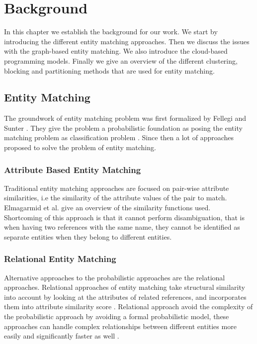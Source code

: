\chapter{Background}
In this chapter we establish the background for our work. We start by introducing the different entity matching approaches. Then we discuss the issues with the graph-based entity matching. We also introduce the cloud-based programming models. Finally we give an overview of the different clustering, blocking and partitioning methods that are used for entity matching.

\section{Entity Matching}
The groundwork of entity matching problem was first formalized by Fellegi and Sunter \cite{FESU69}. They give the problem a probabilistic foundation as posing the entity matching problem as classification problem \cite{RDGa11}. Since then a lot of approaches proposed to solve the problem of entity matching. 

\subsection{Attribute Based Entity Matching}
Traditional entity matching approaches are focused on pair-wise attribute similarities\cite{RDGa11}, i.e the similarity of the attribute values of the pair to match. Elmagarmid et al. \cite{EIVe07} give an overview of the similarity functions used.\\     
Shortcoming of this approach is that it cannot perform disambiguation, that is when having two references with the same name, they cannot be identified as separate entities when they belong to different entities\cite{RDGa11}.

\subsection{Relational Entity Matching}
Alternative approaches to the probabilistic approaches are the relational approaches. Relational approaches of entity matching take structural similarity into account by looking at the attributes of related references, and incorporates them into attribute similarity score \cite{BhGe04}. Relational approach avoid the complexity of the probabilistic approach by avoiding a formal probabilistic model, these approaches can handle complex relationships between different entities more easily and significantly faster as well \cite{BhGe04}.

